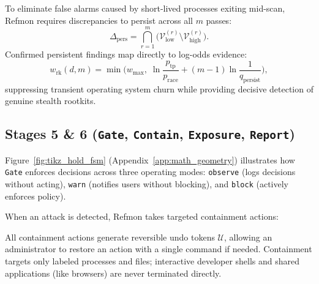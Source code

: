 \documentclass[10pt,twocolumn,letterpaper]{article}
\makeatletter
\theoremstyle{plain}
\theoremstyle{definition}
\theoremstyle{remark}
\DeclareRobustCommand{\_}{\ifmmode\nfss@text{\textunderscore}\else\textunderscore\penalty\@highpenalty\hskip\z@skip\fi}
\makeatother
\begin{document}
To eliminate false alarms caused by short-lived processes exiting mid-scan, Refmon requires discrepancies to persist across all $m$ passes:
\begin{equation}
  \Delta_{\text{pers}} = \bigcap_{r=1}^{m} \Big(\mathcal{V}_{\text{low}}^{(r)} \setminus \mathcal{V}_{\text{high}}^{(r)}\Big).
  \label{eq:crossview_intersect}
\end{equation}
Confirmed persistent findings map directly to log-odds evidence:
\begin{equation}
  w_{\text{rk}}(d, m) = \min\!\Big(w_{\max},\; \ln\frac{p_{\text{tp}}}{p_{\text{race}}} + (m - 1)\ln\frac{1}{q_{\text{persist}}}\Big),
  \label{eq:rk_nats}
\end{equation}
suppressing transient operating system churn while providing decisive detection of genuine stealth rootkits.

\subsection{Stages 5 \& 6 (\texttt{Gate}, \texttt{Contain}, \texttt{Exposure}, \texttt{Report})}
\label{sec:gate}


Figure~\ref{fig:tikz_hold_fsm} (Appendix~\ref{app:math_geometry}) illustrates how \texttt{Gate} enforces decisions across three operating modes: \texttt{observe} (logs decisions without acting), \texttt{warn} (notifies users without blocking), and \texttt{block} (actively enforces policy).

When an attack is detected, Refmon takes targeted containment actions:
All containment actions generate reversible undo tokens $\mathcal{U}$, allowing an administrator to restore an action with a single command if needed. Containment targets only labeled processes and files; interactive developer shells and shared applications (like browsers) are never terminated directly.
\end{document}

